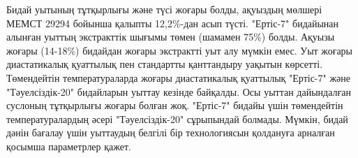 
Бидай уытының тұтқырлығы және түсі жоғары болды, ақуыздың мөлшері МЕМСТ
29294 бойынша қалыпты 12,2\%-дан асып түсті. "Ертіс-7" бидайынан алынған
уыттың экстракттік шығымы төмен (шамамен 75\%) болды. Ақуызы жоғары
(14-18\%) бидайдан жоғары экстрактті уыт алу мүмкін емес. Уыт жоғары
диастатикалық қуаттылық пен стандартты қанттандыру уақытын көрсетті.
Төмендейтін температураларда жоғары диастатикалық қуаттылық "Ертіс-7"
және "Тәуелсіздік-20" бидайларын уыттау кезінде байқалды. Осы уыттан
дайындалған суслоның тұтқырлығы жоғары болған жоқ. "Ертіс-7" бидайы үшін
төмендейтін температуралардың әсері "Тәуелсіздік-20" сұрыпындай болмады.
Мүмкін, бидай дәнін бағалау үшін уыттаудың белгілі бір технологиясын
қолдануға арналған қосымша параметрлер қажет.

